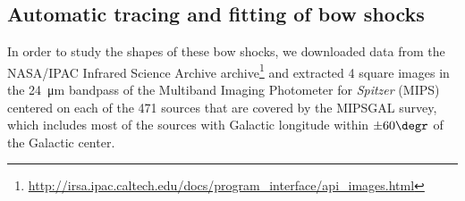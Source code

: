 \subsection{Automatic tracing and fitting of bow shocks}
\label{sec:autom-trac-fitt}


In order to study the shapes of these bow shocks, we downloaded data
from the NASA/IPAC Infrared Science Archive archive\footnote{
  \url{http://irsa.ipac.caltech.edu/docs/program_interface/api_images.html}}
and extracted 4\arcmin{} square images in the \SI{24}{\um} bandpass of
the Multiband Imaging Photometer for \textit{Spitzer} (MIPS) centered
on each of the 471 \citet{Kobulnicky:2016a} sources that are covered
by the MIPSGAL \citep{Carey:2009a} survey, which includes most of the
sources with Galactic longitude within \(\pm 60\degr\) of the Galactic
center.

